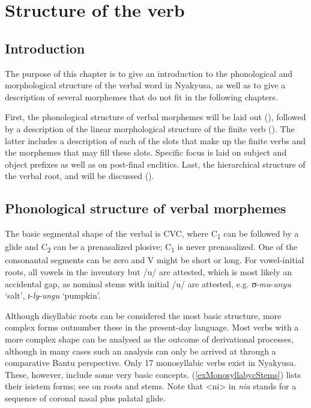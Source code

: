 \chapter{Structure of the verb}
\section{Introduction}
The purpose of this chapter is to give an introduction to the phonological and morphological structure of the verbal word in Nyakyusa, as well as to give a description of several morphemes that do not fit in the following chapters.

First, the phonological structure of verbal morphemes will be laid out (), followed by a description of the linear morphological structure of the finite verb (). The latter includes a description of each of the slots that make up the finite verbs and the morphemes that may fill these slots. Specific focus is laid on subject and object prefixes as well as on post-final enclitics. Last, the hierarchical structure of the verbal root,  and  will be discussed ().

\section{Phonological structure of verbal morphemes}\label{PhonologicalStructureVerbalMorphemes}
The basic segmental shape of the verbal  is CVC, where C\textsubscript{1} can be followed by a glide and C\textsubscript{2} can be a prenasalized plosive; C\textsubscript{1} is never prenasalized. One of the consonantal segments can be zero and V might be short or long. For vowel-initial roots, all vowels in the inventory but /u/ are attested, which is most likely an accidental gap, as nominal stems with initial /u/ are attested, e.g. \textit{ʊ}-\textit{mu}-\textit{unyu} `salt', \textit{ɪ}-\textit{ly}-\textit{ungu} `pumpkin'.

Although disyllabic roots can be considered the most basic structure, more complex forms outnumber these in the present-day language. Most verbs with a more complex shape can be analysed as the outcome of derivational processes, although in many cases such an analysis can only be arrived at through a comparative Bantu perspective. Only 17 monosyllabic verbs exist in Nyakyusa. These, however, include some very basic concepts. (\ref{exMonosyllabycStems}) lists their isi{stem} forms; see  on roots and stems. Note that <ni> in \textit{nia} stands for a sequence of coronal nasal plus palatal glide.


